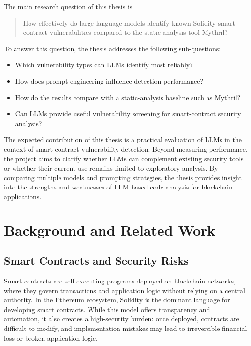 \documentclass[a4paper,11pt]{article}\usepackage{graphicx} %
\begin{document}
The main research question of this thesis is:

\begin{quote}
How effectively do large language models identify known Solidity smart contract vulnerabilities compared to the static analysis tool Mythril?
\end{quote}

To answer this question, the thesis addresses the following sub-questions:
\begin{itemize}
    \item Which vulnerability types can LLMs identify most reliably?
    \item How does prompt engineering influence detection performance?
    \item How do the results compare with a static-analysis baseline such as Mythril?
    \item Can LLMs provide useful vulnerability screening for smart-contract security analysis?
\end{itemize}

The expected contribution of this thesis is a practical evaluation of LLMs in the context of smart-contract vulnerability detection. Beyond measuring performance, the project aims to clarify whether LLMs can complement existing security tools or whether their current use remains limited to exploratory analysis. By comparing multiple models and prompting strategies, the thesis provides insight into the strengths and weaknesses of LLM-based code analysis for blockchain applications.

\section{Background and Related Work}

\subsection{Smart Contracts and Security Risks}

Smart contracts are self-executing programs deployed on blockchain networks, where they govern transactions and application logic without relying on a central authority. In the Ethereum ecosystem, Solidity is the dominant language for developing smart contracts. While this model offers transparency and automation, it also creates a high-security burden: once deployed, contracts are difficult to modify, and implementation mistakes may lead to irreversible financial loss or broken application logic.
\end{document}

